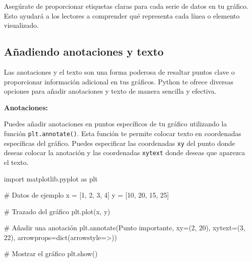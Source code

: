 \documentclass[
  a4paper,
]{article}
\newenvironment{Shaded}{}{}
\newcommand{\BuiltInTok}[1]{\textcolor[rgb]{0.84,0.23,0.29}{#1}}
\newcommand{\CommentTok}[1]{\textcolor[rgb]{0.42,0.45,0.49}{#1}}
\newcommand{\DecValTok}[1]{\textcolor[rgb]{0.00,0.36,0.77}{#1}}
\newcommand{\ImportTok}[1]{\textcolor[rgb]{0.01,0.18,0.38}{#1}}
\newcommand{\NormalTok}[1]{\textcolor[rgb]{0.14,0.16,0.18}{#1}}
\newcommand{\OperatorTok}[1]{\textcolor[rgb]{0.14,0.16,0.18}{#1}}
\newcommand{\StringTok}[1]{\textcolor[rgb]{0.01,0.18,0.38}{#1}}
\begin{document}
Asegúrate de proporcionar etiquetas claras para cada serie de datos en
tu gráfico. Esto ayudará a los lectores a comprender qué representa cada
línea o elemento visualizado.

\hypertarget{auxf1adiendo-anotaciones-y-texto}{%
\subsection{Añadiendo anotaciones y
texto}\label{auxf1adiendo-anotaciones-y-texto}}

Las anotaciones y el texto son una forma poderosa de resaltar puntos
clave o proporcionar información adicional en tus gráficos. Python te
ofrece diversas opciones para añadir anotaciones y texto de manera
sencilla y efectiva.

\textbf{Anotaciones:}

Puedes añadir anotaciones en puntos específicos de tu gráfico utilizando
la función \texttt{plt.annotate()}. Esta función te permite colocar
texto en coordenadas específicas del gráfico. Puedes especificar las
coordenadas \texttt{xy} del punto donde deseas colocar la anotación y
las coordenadas \texttt{xytext} donde deseas que aparezca el texto.

\begin{Shaded}
\begin{Highlighting}[]
\ImportTok{import}\NormalTok{ matplotlib.pyplot }\ImportTok{as}\NormalTok{ plt}

\CommentTok{\# Datos de ejemplo}
\NormalTok{x }\OperatorTok{=}\NormalTok{ [}\DecValTok{1}\NormalTok{, }\DecValTok{2}\NormalTok{, }\DecValTok{3}\NormalTok{, }\DecValTok{4}\NormalTok{]}
\NormalTok{y }\OperatorTok{=}\NormalTok{ [}\DecValTok{10}\NormalTok{, }\DecValTok{20}\NormalTok{, }\DecValTok{15}\NormalTok{, }\DecValTok{25}\NormalTok{]}

\CommentTok{\# Trazado del gráfico}
\NormalTok{plt.plot(x, y)}

\CommentTok{\# Añadir una anotación}
\NormalTok{plt.annotate(}\StringTok{\textquotesingle{}Punto importante\textquotesingle{}}\NormalTok{, xy}\OperatorTok{=}\NormalTok{(}\DecValTok{2}\NormalTok{, }\DecValTok{20}\NormalTok{), xytext}\OperatorTok{=}\NormalTok{(}\DecValTok{3}\NormalTok{, }\DecValTok{22}\NormalTok{),}
\NormalTok{             arrowprops}\OperatorTok{=}\BuiltInTok{dict}\NormalTok{(arrowstyle}\OperatorTok{=}\StringTok{\textquotesingle{}{-}\textgreater{}\textquotesingle{}}\NormalTok{))}

\CommentTok{\# Mostrar el gráfico}
\NormalTok{plt.show()}
\end{Highlighting}
\end{Shaded}
\end{document}
